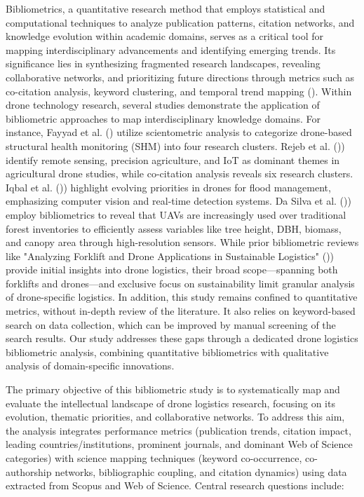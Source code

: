 \documentclass{article}
\begin{document}
Bibliometrics, a quantitative research method that employs statistical and computational techniques to analyze publication patterns, citation networks, and knowledge evolution within academic domains, serves as a critical tool for mapping interdisciplinary advancements and identifying emerging trends. Its significance lies in synthesizing fragmented research landscapes, revealing collaborative networks, and prioritizing future directions through metrics such as co-citation analysis, keyword clustering, and temporal trend mapping (\cite{WOS:000958189000001}). Within drone technology research, several studies demonstrate the application of bibliometric approaches to map interdisciplinary knowledge domains. For instance, Fayyad et al.   (\cite{WOS:001229751500001}) utilize scientometric analysis to categorize drone-based structural health monitoring (SHM) into four research clusters.  Rejeb et al. (\cite{WOS:000830895100002})) identify remote sensing, precision agriculture, and IoT as dominant themes in agricultural drone studies, while co-citation analysis reveals six research clusters. Iqbal et al.  (\cite{WOS:000914960100001})) highlight evolving priorities in drones for flood management, emphasizing computer vision and real-time detection systems.  Da Silva et al.  (\cite{WOS:001366904300001})) employ bibliometrics to reveal that UAVs are increasingly used over traditional forest inventories to efficiently assess variables like tree height, DBH, biomass, and canopy area through high-resolution sensors. While prior bibliometric reviews like "Analyzing Forklift and Drone Applications in Sustainable Logistics" (\cite{WOS:001329532200078})) provide initial insights into drone logistics, their broad scope—spanning both forklifts and drones—and exclusive focus on sustainability limit granular analysis of drone-specific logistics. In addition, this study remains confined to quantitative metrics, without in-depth review of the literature. It also relies on keyword-based search on data collection, which can be improved by manual screening of the search results. Our study addresses these gaps through a dedicated drone logistics bibliometric analysis, combining quantitative bibliometrics with qualitative analysis of domain-specific innovations. 

The primary objective of this bibliometric study is to systematically map and evaluate the intellectual landscape of drone logistics research, focusing on its evolution, thematic priorities, and collaborative networks. To address this aim, the analysis integrates performance metrics (publication trends, citation impact, leading countries/institutions, prominent journals, and dominant Web of Science categories) with science mapping techniques (keyword co-occurrence, co-authorship networks, bibliographic coupling, and citation dynamics) using data extracted from Scopus and Web of Science. Central research questions include: 
\end{document}
